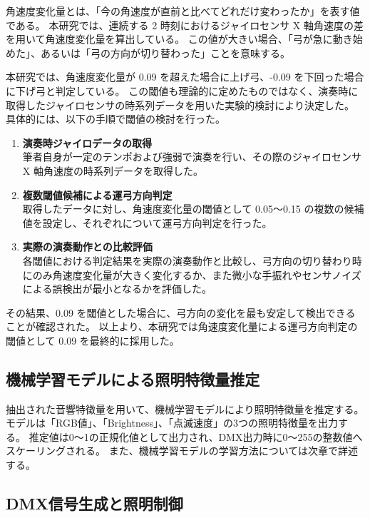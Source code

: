 角速度変化量とは、「今の角速度が直前と比べてどれだけ変わったか」を表す値である。
本研究では、連続する 2 時刻におけるジャイロセンサ X 軸角速度の差を用いて角速度変化量を算出している。
この値が大きい場合、「弓が急に動き始めた」、あるいは「弓の方向が切り替わった」ことを意味する。

本研究では、角速度変化量が 0.09 を超えた場合に上げ弓、-0.09 を下回った場合に下げ弓と判定している。
この閾値も理論的に定めたものではなく、演奏時に取得したジャイロセンサの時系列データを用いた実験的検討により決定した。
具体的には、以下の手順で閾値の検討を行った。

\begin{enumerate}
	\item \textbf{演奏時ジャイロデータの取得}　\\
	    筆者自身が一定のテンポおよび強弱で演奏を行い、その際のジャイロセンサ X 軸角速度の時系列データを取得した。
	\item \textbf{複数閾値候補による運弓方向判定}　\\
	    取得したデータに対し、角速度変化量の閾値として 0.05～0.15 の複数の候補値を設定し、それぞれについて運弓方向判定を行った。
	\item \textbf{実際の演奏動作との比較評価}　\\
        各閾値における判定結果を実際の演奏動作と比較し、弓方向の切り替わり時にのみ角速度変化量が大きく変化するか、また微小な手振れやセンサノイズによる誤検出が最小となるかを評価した。
\end{enumerate}

その結果、0.09 を閾値とした場合に、弓方向の変化を最も安定して検出できることが確認された。
以上より、本研究では角速度変化量による運弓方向判定の閾値として 0.09 を最終的に採用した。

\subsection{機械学習モデルによる照明特徴量推定} \label{sec:light}

抽出された音響特徴量を用いて、機械学習モデルにより照明特徴量を推定する。
モデルは「RGB値」、「Brightness」、「点滅速度」の3つの照明特徴量を出力する。
推定値は0〜1の正規化値として出力され、DMX出力時に0〜255の整数値へスケーリングされる。
また、機械学習モデルの学習方法については次章で詳述する。

\subsection{DMX信号生成と照明制御}

